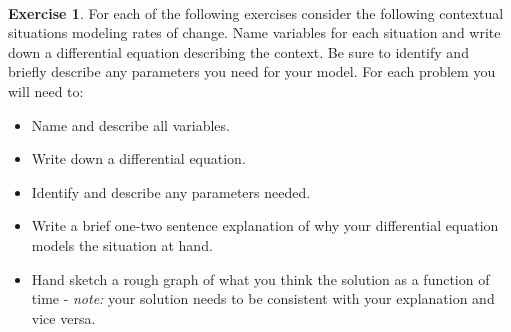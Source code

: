 \documentclass[
]{book}
\theoremstyle{definition}
\theoremstyle{definition}
\theoremstyle{definition}
\newtheorem{exercise}{Exercise}[chapter]
\theoremstyle{remark}
\begin{document}
~

\begin{exercise}
\protect\hypertarget{exr:unnamed-chunk-59}{}{\label{exr:unnamed-chunk-59} }For each of the following exercises consider the following contextual situations modeling rates of change. Name variables for each situation and write down a differential equation describing the context. Be sure to identify and briefly describe any parameters you need for your model. For each problem you will need to:

\begin{itemize}
\item Name and describe all variables.
\item Write down a differential equation.
\item Identify and describe any parameters needed.
\item Write a brief one-two sentence explanation of why your differential equation models the situation at hand.
\item Hand sketch a rough graph of what you think the solution as a function of time - \emph{note:} your solution needs to be consistent with your explanation and vice versa.
\end{itemize}


\end{exercise}
\end{document}
